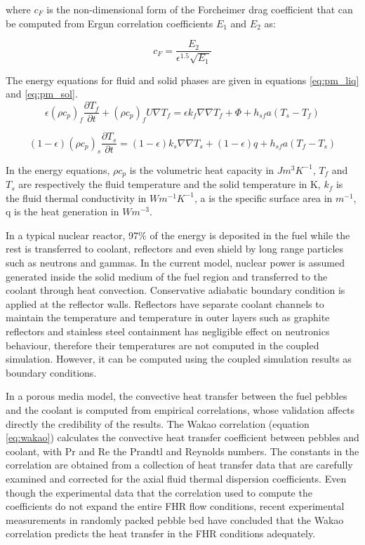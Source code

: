 \documentclass{elsarticle}
\begin{document}
where $c_F$ is the non-dimensional form of the Forcheimer drag coefficient that can be computed from Ergun correlation coefficients $E_1$ and $E_2$ as:

\begin{equation}
    c_F = \frac{E_2}{\epsilon^{1.5}\sqrt{E_1}}
\end{equation}



The energy equations for fluid and solid phases are given in equations \ref{eq:pm_liq} and \ref{eq:pm_sol}.
\begin{equation}
  \epsilon(\rho c_p)_f \frac{\partial T_f}{\partial t} + (\rho c_p)_f U\nabla T_f = \epsilon k_f \nabla\nabla T_f + \Phi + h_{sf}a(T_s - T_f)
  \label{eq:pm_liq}
\end{equation}

\begin{equation}
  (1-\epsilon)(\rho c_p)_s \frac{\partial T_s}{\partial t} =(1-\epsilon)k_s \nabla\nabla T_s + (1-\epsilon)q + h_{sf}a(T_f - T_s)
  \label{eq:pm_sol}
\end{equation}

In the energy equations, $\rho c_p$ is the volumetric heat capacity in $Jm^3K^{-1}$, $T_f$ and $T_s$ are respectively the fluid temperature and the solid temperature in K, $k_f$ is the fluid thermal conductivity in $Wm^{-1}K^{-1}$, a is the specific surface area in $m^{-1}$, q is the heat generation in $Wm^{-3}$.

In a typical nuclear reactor, 97\% of the energy is deposited in the fuel while the rest is transferred to coolant, reflectors and even shield by long range particles such as neutrons and gammas. 
In the current model, nuclear power is assumed generated inside the solid medium of the fuel region and transferred to the coolant through heat convection. Conservative adiabatic boundary condition is applied at the reflector walls. Reflectors have separate coolant channels to maintain the temperature and temperature in outer layers such as graphite reflectors and stainless steel containment has negligible effect on neutronics behaviour, therefore their temperatures are not computed in the coupled simulation. However, it can be computed using the coupled simulation results as boundary conditions.

In a porous media model, the convective heat transfer between the fuel pebbles and the coolant is computed from empirical correlations, whose validation affects directly the credibility of the results. The Wakao correlation (equation \ref{eq:wakao}) \cite{Wakao1979} calculates the convective heat transfer coefficient between pebbles and coolant, with Pr and Re the Prandtl and Reynolds numbers.
The constants in the correlation are obtained from a collection of heat transfer data that are carefully examined and corrected for the axial fluid thermal dispersion coefficients. Even though the experimental data that the correlation used to compute the coefficients do not expand the entire FHR flow conditions, recent experimental measurements in randomly packed pebble bed \cite{Huddar2016} have concluded that the Wakao correlation predicts the heat transfer in the FHR conditions adequately.
\end{document}

